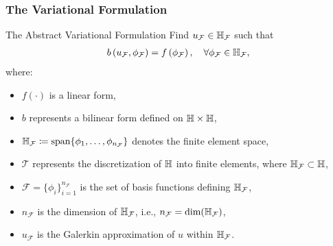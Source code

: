 \begin{frame}
\frametitle{The Variational Formulation}
    \begin{block}{The Abstract Variational Formulation}
        Find $u_{\mathcal{F}} \in \mathbb{H}_{\mathcal{F}}$ such that
        \begin{align}
        \label{eq:directH1}
            b\left(u_{\mathcal{F}},\phi_{\mathcal{F}}\right) = f\left(\phi_{\mathcal{F}}\right), \quad \forall \phi_{\mathcal{F}} \in \mathbb{H}_{\mathcal{F}},
        \end{align}
        where:
        \begin{itemize}
            \item $f(\cdot)$ is a linear form,
            \item $b$ represents a bilinear form defined on $\mathbb{H} \times \mathbb{H}$,
            \item $\mathbb{H}_{\mathcal{F}} \coloneqq \textrm{span}\{\phi_{1}, \dots, \phi_{n_{\mathcal{F}}}\}$ denotes the finite element space,
            \item $\mathcal{T}$ represents the discretization of $\mathbb{H}$ into finite elements, where $\mathbb{H}_{\mathcal{F}} \subset \mathbb{H}$,
            \item $\mathcal{F} = \{\phi_{i}\}_{i=1}^{n_{\mathcal{F}}}$ is the set of basis functions defining $\mathbb{H}_{\mathcal{F}}$,
            \item $n_{\mathcal{F}}$ is the dimension of $\mathbb{H}_{\mathcal{F}}$, i.e., $n_{\mathcal{F}} = \textrm{dim}(\mathbb{H}_{\mathcal{F}})$,
            \item $u_{\mathcal{F}}$ is the Galerkin approximation of $u$ within $\mathbb{H}_{\mathcal{F}}$.
        \end{itemize}
    \end{block}     
\end{frame}

